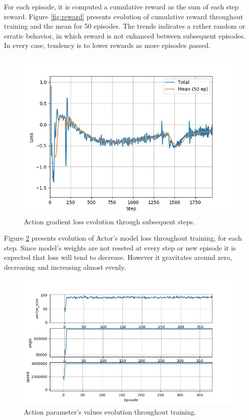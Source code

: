 \documentclass[peerreview,onecolumn]{IEEEtran}
\begin{document}
	 
	
	For each episode, it is computed a cumulative reward as the sum of each step reward. Figure \ref{fig:reward} presents evolution of cumulative reward throughout training and the mean for 50 episodes. The trends indicates a rather random or erratic behavior, in which reward is not enhanced between subsequent episodes. In every case, tendency is to lower rewards as more episodes passed.
	
	\begin{figure}[!h]
		\centering
		\includegraphics[width=0.9\columnwidth]{img/loss.png} 
		\caption{Action gradient loss evolution through subsequent steps.}
		\label{fig:loss}
	\end{figure}
	
	Figure \ref{fig:loss} presents evolution of Actor's model loss throughout training, for each step. Since model's weights are not reseted at every step or new episode it is expected that loss will tend to decrease. However it gravitates around zero, decreasing and increasing almost evenly.
	
	\begin{figure}[!h]
		\centering
		\includegraphics[width=0.9\columnwidth]{img/action.png} 
		\caption{Action parameter's values evolution throughout training.}
		\label{fig:loss}
	\end{figure}
	
\end{document}
